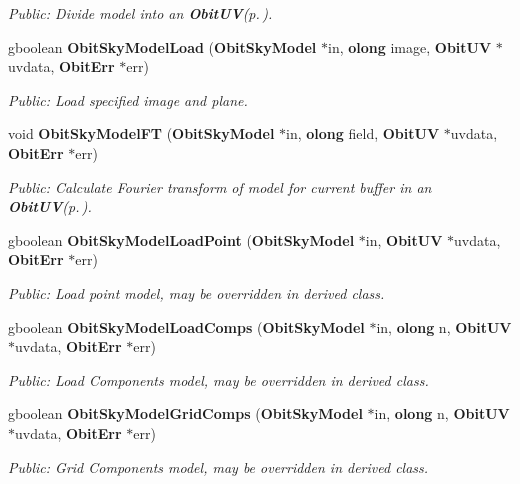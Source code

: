 \begin{CompactItemize}
\begin{CompactList}\small\item\em Public: Divide model into an {\bf Obit\-UV}{\rm (p.\,\pageref{structObitUV})}. \item\end{CompactList}\item 
gboolean {\bf Obit\-Sky\-Model\-Load} ({\bf Obit\-Sky\-Model} $\ast$in, {\bf olong} image, {\bf Obit\-UV} $\ast$uvdata, {\bf Obit\-Err} $\ast$err)
\begin{CompactList}\small\item\em Public: Load specified image and plane. \item\end{CompactList}\item 
void {\bf Obit\-Sky\-Model\-FT} ({\bf Obit\-Sky\-Model} $\ast$in, {\bf olong} field, {\bf Obit\-UV} $\ast$uvdata, {\bf Obit\-Err} $\ast$err)
\begin{CompactList}\small\item\em Public: Calculate Fourier transform of model for current buffer in an {\bf Obit\-UV}{\rm (p.\,\pageref{structObitUV})}. \item\end{CompactList}\item 
gboolean {\bf Obit\-Sky\-Model\-Load\-Point} ({\bf Obit\-Sky\-Model} $\ast$in, {\bf Obit\-UV} $\ast$uvdata, {\bf Obit\-Err} $\ast$err)
\begin{CompactList}\small\item\em Public: Load point model, may be overridden in derived class. \item\end{CompactList}\item 
gboolean {\bf Obit\-Sky\-Model\-Load\-Comps} ({\bf Obit\-Sky\-Model} $\ast$in, {\bf olong} n, {\bf Obit\-UV} $\ast$uvdata, {\bf Obit\-Err} $\ast$err)
\begin{CompactList}\small\item\em Public: Load Components model, may be overridden in derived class. \item\end{CompactList}\item 
gboolean {\bf Obit\-Sky\-Model\-Grid\-Comps} ({\bf Obit\-Sky\-Model} $\ast$in, {\bf olong} n, {\bf Obit\-UV} $\ast$uvdata, {\bf Obit\-Err} $\ast$err)
\begin{CompactList}\small\item\em Public: Grid Components model, may be overridden in derived class. \item\end{CompactList}\item 

\end{CompactItemize}
